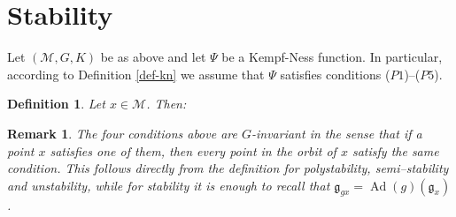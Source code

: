 \documentclass[leqno,11pt, a4]{amsart}
\newtheorem{defin}[equation]{Definition}
\newtheorem{remark}[equation]{Remark}
\theoremstyle{named}
\begin{document}
\section{Stability}
 \label{sec:stab-with-resp}
 Let $({\mathscr{M}},G, K) $ be as above and let $\Psi$ be a Kempf-Ness
 function. In particular, according to Definition \ref{def-kn} we assume that $\Psi$ satisfies conditions ($P1$)--($P5$).
 \begin{defin}
   \label{stabilita}
   Let $x\in {\mathscr{M}}$. Then:
 \end{defin}
\begin{remark}
   
   The four conditions above are $G$-invariant in the sense that if a
   point $x$ satisfies one of them, then every point in the orbit of
   $x$ satisfy the same condition. This follows directly from the definition
   for polystability, semi--stability and unstability, while for 
   stability 
    it is enough to recall that
   ${\mathfrak{g}}_{g x} = {\operatorname{Ad}}(g) ({\mathfrak{g}}_x)$.
   
 \end{remark}
\end{document}
